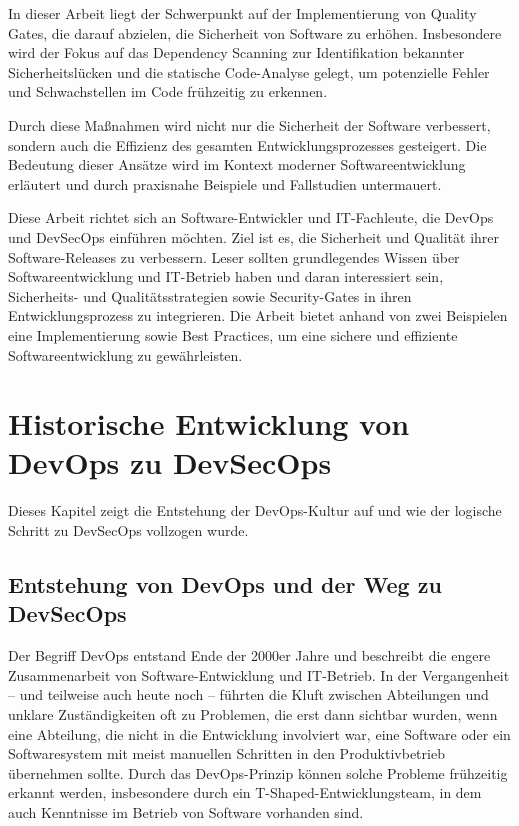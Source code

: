 \documentclass[conference,compsoc,final,a4paper]{IEEEtran}
\begin{document}
In dieser Arbeit liegt der Schwerpunkt auf der Implementierung von Quality Gates, die darauf abzielen, die Sicherheit von Software zu erhöhen. Insbesondere wird der Fokus auf das Dependency Scanning zur Identifikation bekannter Sicherheitslücken und die statische Code-Analyse gelegt, um potenzielle Fehler und Schwachstellen im Code frühzeitig zu erkennen.

Durch diese Maßnahmen wird nicht nur die Sicherheit der Software verbessert, sondern auch die Effizienz des gesamten Entwicklungsprozesses gesteigert. Die Bedeutung dieser Ansätze wird im Kontext moderner Softwareentwicklung erläutert und durch praxisnahe Beispiele und Fallstudien untermauert.


Diese Arbeit richtet sich an Software-Entwickler und IT-Fachleute, die DevOps und DevSecOps einführen möchten. Ziel ist es, die Sicherheit und Qualität ihrer Software-Releases zu verbessern. Leser sollten grundlegendes Wissen über Softwareentwicklung und IT-Betrieb haben und daran interessiert sein, Sicherheits- und Qualitätsstrategien sowie Security-Gates in ihren Entwicklungsprozess zu integrieren. Die Arbeit bietet anhand von zwei Beispielen eine Implementierung sowie Best Practices, um eine sichere und effiziente Softwareentwicklung zu gewährleisten.


\section{Historische Entwicklung von DevOps zu DevSecOps}
Dieses Kapitel zeigt die Entstehung der DevOps-Kultur auf und wie der logische Schritt zu DevSecOps vollzogen wurde.

\subsection{Entstehung von DevOps und der Weg zu DevSecOps}
Der Begriff DevOps entstand Ende der 2000er Jahre und beschreibt die engere Zusammenarbeit von Software-Entwicklung und IT-Betrieb. In der Vergangenheit – und teilweise auch heute noch – führten die Kluft zwischen Abteilungen und unklare Zuständigkeiten oft zu Problemen, die erst dann sichtbar wurden, wenn eine Abteilung, die nicht in die Entwicklung involviert war, eine Software oder ein Softwaresystem mit meist manuellen Schritten in den Produktivbetrieb übernehmen sollte. Durch das DevOps-Prinzip können solche Probleme frühzeitig erkannt werden, insbesondere durch ein T-Shaped-Entwicklungsteam, in dem auch Kenntnisse im Betrieb von Software vorhanden sind.
\end{document}
